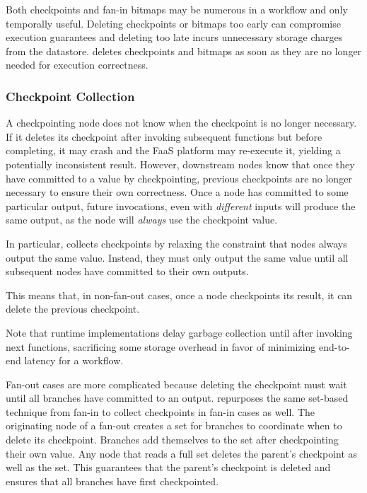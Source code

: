 Both checkpoints and fan-in bitmaps may be numerous in a workflow and only
temporally useful. Deleting checkpoints or bitmaps too early can compromise
execution guarantees and deleting too late incurs unnecessary storage charges
from the datastore. \name{} deletes checkpoints and bitmaps as soon as they are
no longer needed for execution correctness.

\subsubsection{Checkpoint Collection}

A checkpointing node does not know when the checkpoint is no longer necessary.
If it deletes its checkpoint after invoking subsequent functions but before
completing, it may crash and the FaaS platform may re-execute it, yielding a
potentially inconsistent result. However, downstream nodes know that once they
have committed to a value by checkpointing, previous checkpoints are no longer
necessary to ensure their own correctness. Once a node has committed to some
particular output, future invocations, even with \emph{different} inputs will produce the same output, as the node will \emph{always} use the checkpoint value.

In particular, \name{} collects checkpoints by relaxing the constraint that
nodes always output the same value. Instead, they must only output the same
value until all subsequent nodes have committed to their own outputs.

This means that, in non-fan-out cases, once a node checkpoints its result, it
can delete the previous checkpoint.

Note that \name{} runtime implementations delay garbage collection until after
invoking next functions, sacrificing some storage overhead in favor of
minimizing end-to-end latency for a workflow.

Fan-out cases are more complicated because deleting the checkpoint must wait
until all branches have committed to an output. \name{} repurposes the same
set-based technique from fan-in to collect checkpoints in fan-in cases as well.
The originating node of a fan-out creates a set for branches to coordinate when
to delete its checkpoint. Branches add themselves to the set after checkpointing
their own value. Any node that reads a full set deletes the parent's checkpoint
as well as the set. This guarantees that the parent's checkpoint is deleted and
ensures that all branches have first checkpointed.

